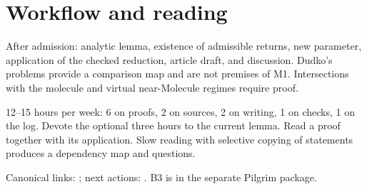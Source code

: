 \section{Workflow and reading}
After admission: analytic lemma, existence of admissible returns,
new parameter, application of the checked reduction, article draft,
and discussion. Dudko's problems provide a comparison map and are not
premises of M1. Intersections with the molecule and virtual near-Molecule
regimes require proof.

12--15 hours per week: 6 on proofs, 2 on sources, 2 on writing,
1 on checks, 1 on the log. Devote the optional three hours to the current
lemma. Read a proof together with its application. Slow reading with
selective copying of statements produces a dependency map and questions.

Canonical links: ; next actions:
. B3 is in the separate Pilgrim package.
